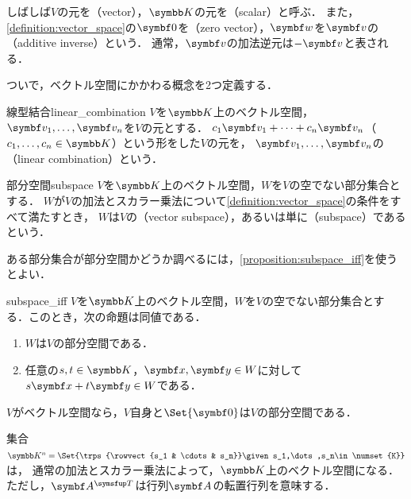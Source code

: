 \documentclass[../../main]{subfiles}
\begin{document}
しばしば\(V\)の元を（vector），\(\numset{K}\)の元を（scalar）と呼ぶ．
また，\cref{definition:vector_space}の\(\zvec\)を（zero vector），\(\vect{w}\)を\(\vect{v}\)の（additive inverse）という．
通常，\(\vect{v}\)の加法逆元は\(-\vect{v}\)と表される．

ついで，ベクトル空間にかかわる概念を2つ定義する．

\begin{definition}{線型結合}{linear_combination}
  \(V\)を\(\numset{K}\)上のベクトル空間，\(\vect{v}_1,\dots,\vect{v}_n\)を\(V\)の元とする．
  \(c_1\vect{v}_1+\dots+c_n\vect{v}_n\)（\(c_1,\dots,c_n\in\numset{K}\)）という形をした\(V\)の元を，
  \(\vect{v}_1,\dots,\vect{v}_n\)の（linear combination）という．
\end{definition}

\begin{definition}{部分空間}{subspace}
  \(V\)を\(\numset{K}\)上のベクトル空間，\(W\)を\(V\)の空でない部分集合とする．
  \(W\)が\(V\)の加法とスカラー乗法について\cref{definition:vector_space}の条件をすべて満たすとき，
  \(W\)は\(V\)の（vector subspace），あるいは単に（subspace）であるという．    
\end{definition}

ある部分集合が部分空間かどうか調べるには，\cref{proposition:subspace_iff}を使うとよい．

\begin{proposition}{}{subspace_iff}
  \(V\)を\(\numset{K}\)上のベクトル空間，\(W\)を\(V\)の空でない部分集合とする．このとき，次の命題は同値である．
  \begin{enumerate}
    \item \(W\)は\(V\)の部分空間である．
    \item 任意の\(s,t\in\numset{K}\)，\(\vect{x},\vect{y}\in W\)に対して\(s\vect{x}+t\vect{y}\in W\)である．
  \end{enumerate}
\end{proposition}

\begin{example}
  \(V\)がベクトル空間なら，\(V\)自身と\(\Set{\zvec}\)は\(V\)の部分空間である．
\end{example}

\begin{example}
  集合\(\numset{K}^n=\Set{\trps{\rowvect{s_1 & \cdots & s_n}}\given s_1,\dots,s_n\in\numset{K}}\)は，
  通常の加法とスカラー乗法によって，\(\numset{K}\)上のベクトル空間になる．ただし，\(\trps{\mat{A}}\)は行列\(\mat{A}\)の転置行列を意味する．
\end{example}
\end{document}
